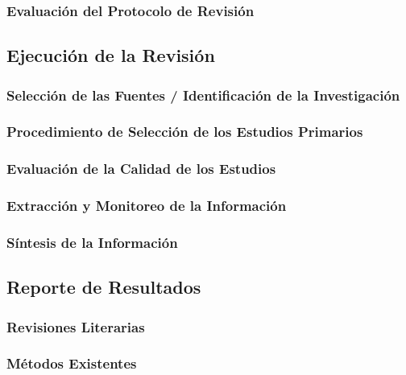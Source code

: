 \documentclass{report}
\begin{document}
            \subsubsection{Evaluación del Protocolo de Revisión}


        \subsection{Ejecución de la Revisión}
    
    
            \subsubsection{Selección de las Fuentes / Identificación de la Investigación}
    

    
            \subsubsection{Procedimiento de Selección de los Estudios Primarios}
    
            \subsubsection{Evaluación de la Calidad de los Estudios}
    
    	    \subsubsection{Extracción y Monitoreo de la Información}
	
    	    \subsubsection{Síntesis de la Información}
	
	    \subsection{Reporte de Resultados}
	
    	    \subsubsection{Revisiones Literarias}    
    
            \subsubsection{Métodos Existentes}
        
\end{document}
